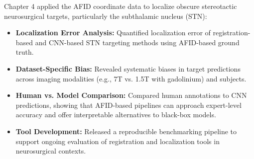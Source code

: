 Chapter 4 applied the AFID coordinate data to localize obscure stereotactic neurosurgical targets, particularly the subthalamic nucleus (STN):
\begin{itemize}
    \item \textbf{Localization Error Analysis:} Quantified localization error of registration-based and CNN-based STN targeting methods using AFID-based ground truth.
    \item \textbf{Dataset-Specific Bias:} Revealed systematic biases in target predictions across imaging modalities (e.g., 7T vs. 1.5T with gadolinium) and subjects.
    \item \textbf{Human vs. Model Comparison:} Compared human annotations to CNN predictions, showing that AFID-based pipelines can approach expert-level accuracy and offer interpretable alternatives to black-box models.
    \item \textbf{Tool Development:} Released a reproducible benchmarking pipeline to support ongoing evaluation of registration and localization tools in neurosurgical contexts.
\end{itemize}
